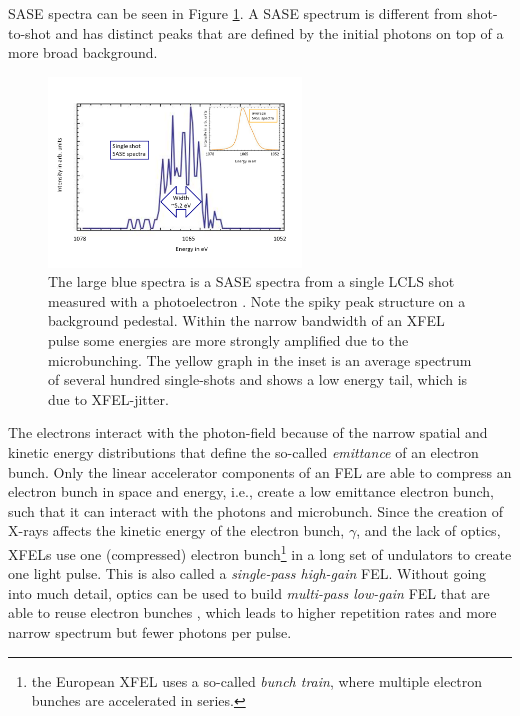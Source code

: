 SASE spectra can be seen in Figure \ref{fig:SASE-spectra}. A SASE spectrum is different from shot-to-shot and has distinct peaks that are defined by the initial photons on top of a more broad background.
\begin{figure}
	\centering
		\includegraphics[width=0.60\textwidth]{images/SASE-spectra.png}
	\caption[SASE single-shot and average spectra]{The large blue spectra is a SASE spectra from a single LCLS shot measured with a photoelectron \citep[see][]{Bucher-2014-Unpublished}. Note the spiky peak structure on a background pedestal. Within the narrow bandwidth of an XFEL pulse some energies are more strongly amplified due to the microbunching. The yellow graph in the inset is an average spectrum of several hundred single-shots and shows a low energy tail, which is due to XFEL-jitter.}
	\label{fig:SASE-spectra}
\end{figure}
The electrons interact with the photon-field because of the narrow spatial and kinetic energy distributions that define the so-called \textit{emittance} of an electron bunch. Only the linear accelerator components of an FEL are able to compress an electron bunch in space and energy, i.e., create a low emittance electron bunch, such that it can interact with the photons and microbunch. Since the creation of X-rays affects the kinetic energy of the electron bunch, $\gamma$, and the lack of optics, XFELs use one (compressed) electron bunch\footnote{the European XFEL uses a so-called \textit{bunch train}, where multiple electron bunches are accelerated in series.} in a long set of undulators to create one light pulse. This is also called a \textit{single-pass high-gain} FEL. Without going into much detail, optics can be used to build \textit{multi-pass low-gain} FEL that are able to reuse electron bunches \citep{Kim-2008-PRL}, which leads to higher repetition rates and more narrow spectrum but fewer photons per pulse.
%
%
%
%
